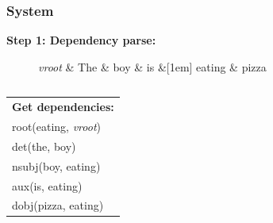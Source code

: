 \documentclass[handout,xcolor={dvipsnames}]{beamer}
\begin{document}
\begin{frame}
\frametitle{System}

\textbf{Step 1: Dependency parse:}

\begin{figure}[htb!]
\begin{center}
    \begin{dependency}[arc edge,text only label,label style={above}]
    \begin{deptext}[column sep=.5em]
      \textit{vroot} \& The \& boy \& is \&[1em] eating \& pizza \\
    \end{deptext}
  \end{dependency}
\end{center}
\label{fig:prep-dependency}
\end{figure}

\begin{columns}
\pause
{}

\begin{table}
\begin{tabular}{l}
\textbf{Get dependencies:} \\
root(eating, \textit{vroot}) \\
det(the, boy) \\
nsubj(boy, eating) \\
aux(is, eating) \\
dobj(pizza, eating) \\
\end{tabular}
\end{table}



\end{columns}
\end{frame}
\end{document}
